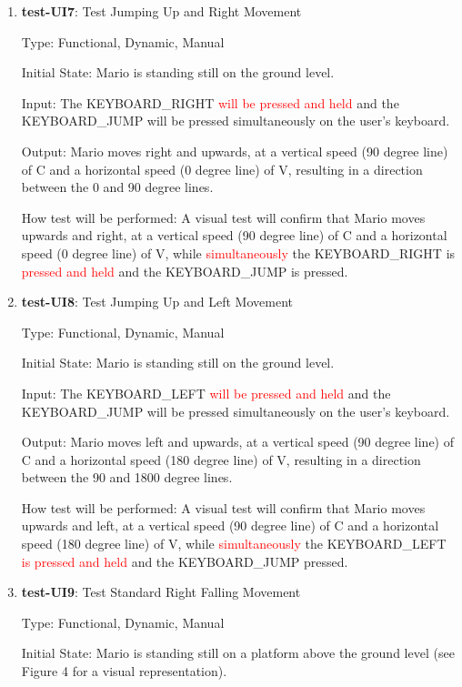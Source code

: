 \documentclass[12pt, titlepage]{article}
\begin{document}
\begin{enumerate}
\item{\textbf{test-UI7}: Test Jumping Up and Right Movement\\}

Type: Functional, Dynamic, Manual

Initial State: Mario is standing still on the ground level.

Input: The KEYBOARD\_RIGHT \textcolor{red}{will be pressed and held} and the KEYBOARD\_JUMP will be pressed simultaneously on the user's keyboard.

Output: Mario moves right and upwards, at a vertical speed (90 degree line) of C and a horizontal speed (0 degree line) of V, resulting in a direction between the 0 and 90 degree lines.

How test will be performed: A visual test will confirm that Mario moves upwards and right, at a vertical speed (90 degree line) of C and a horizontal speed (0 degree line) of V, while \textcolor{red}{simultaneously} the KEYBOARD\_RIGHT is \textcolor{red}{pressed and held} and the KEYBOARD\_JUMP is pressed.

\item{\textbf{test-UI8}: Test Jumping Up and Left Movement\\}

Type: Functional, Dynamic, Manual

Initial State: Mario is standing still on the ground level.

Input: The KEYBOARD\_LEFT \textcolor{red}{will be pressed and held} and the KEYBOARD\_JUMP will be pressed simultaneously on the user's keyboard.

Output: Mario moves left and upwards, at a vertical speed (90 degree line) of C and a horizontal speed (180 degree line) of V, resulting in a direction between the 90 and 1800 degree lines.

How test will be performed: A visual test will confirm that Mario moves upwards and left, at a vertical speed (90 degree line) of C and a horizontal speed (180 degree line) of V, while \textcolor{red}{simultaneously} the KEYBOARD\_LEFT \textcolor{red}{is pressed and held} and the KEYBOARD\_JUMP pressed.

\item{\textbf{test-UI9}: Test Standard Right Falling Movement\\}

Type: Functional, Dynamic, Manual

Initial State: Mario is standing still on a platform above the ground level (see Figure 4 for a visual representation).


\end{enumerate}
\end{document}
